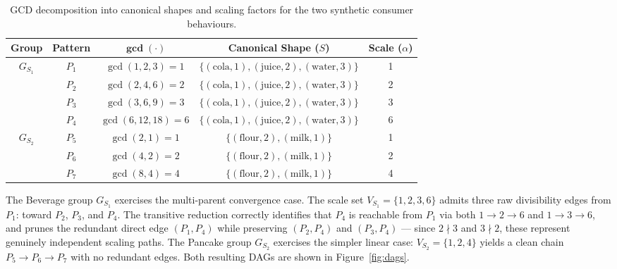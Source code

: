 \documentclass[10pt, twocolumn]{article}
\begin{document}
\begin{table}[h]
    \centering
    \begin{tabular}{|c|c|c|c|c|}
        \hline
        \textbf{Group} & \textbf{Pattern} & $\mathbf{\gcd(\cdot)}$ &
        \textbf{Canonical Shape ($S$)}                              &
        \textbf{Scale ($\alpha$)}                                                                                            \\
        \hline
        $G_{S_1}$      & $P_1$            & $\gcd(1,2,3)=1$        &
        $\{(\text{cola},1),(\text{juice},2),(\text{water},3)\}$     & 1                                                       \\
                       & $P_2$            & $\gcd(2,4,6)=2$        &
        $\{(\text{cola},1),(\text{juice},2),(\text{water},3)\}$     & 2                                                       \\
                       & $P_3$            & $\gcd(3,6,9)=3$        &
        $\{(\text{cola},1),(\text{juice},2),(\text{water},3)\}$     & 3                                                       \\
                       & $P_4$            & $\gcd(6,12,18)=6$      &
        $\{(\text{cola},1),(\text{juice},2),(\text{water},3)\}$     & 6                                                       \\
        \hline
        $G_{S_2}$      & $P_5$            & $\gcd(2,1)=1$          &
        $\{(\text{flour},2),(\text{milk},1)\}$                      & 1                                                       \\
                       & $P_6$            & $\gcd(4,2)=2$          &
        $\{(\text{flour},2),(\text{milk},1)\}$                      & 2                                                       \\
                       & $P_7$            & $\gcd(8,4)=4$          &
        $\{(\text{flour},2),(\text{milk},1)\}$                      & 4                                                       \\
        \hline
    \end{tabular}
    \caption{GCD decomposition into canonical shapes and scaling factors
        for the two synthetic consumer behaviours.}
    \label{tab:gcd_decomposition}
\end{table}

The Beverage group $G_{S_1}$ exercises the multi-parent convergence case.
The scale set $V_{S_1} = \{1,2,3,6\}$ admits three raw divisibility edges
from $P_1$: toward $P_2$, $P_3$, and $P_4$. The transitive reduction
correctly identifies that $P_4$ is reachable from $P_1$ via both
$1 \rightarrow 2 \rightarrow 6$ and $1 \rightarrow 3 \rightarrow 6$, and
prunes the redundant direct edge $(P_1, P_4)$ while preserving $(P_2, P_4)$
and $(P_3, P_4)$ — since $2 \nmid 3$ and $3 \nmid 2$, these represent
genuinely independent scaling paths. The Pancake group $G_{S_2}$ exercises
the simpler linear case: $V_{S_2} = \{1,2,4\}$ yields a clean chain
$P_5 \rightarrow P_6 \rightarrow P_7$ with no redundant edges. Both
resulting DAGs are shown in Figure~\ref{fig:dags}.
\end{document}
